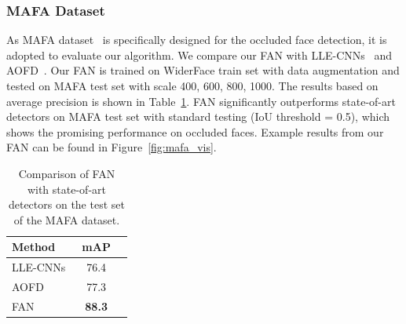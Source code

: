 \documentclass[10pt,twocolumn,letterpaper]{article}
\begin{document}
\begin{table}[t]
\begin{center}
\end{center}
\caption{Comparison of FAN with state-of-art detectors on the test set of the WiderFace dataset.}
\label{table: widerface_result}
\end{table}

\subsubsection{MAFA Dataset} 
As MAFA dataset~\cite{Ge_2017_CVPR} is specifically designed for the occluded face detection, it is adopted to evaluate our algorithm. We compare our FAN with LLE-CNNs~\cite{Ge_2017_CVPR} and AOFD~\cite{chen2017masquer}. Our FAN is trained on WiderFace train set with data augmentation and tested on MAFA test set with scale {400, 600, 800, 1000}. The results based on average precision is shown in Table~\ref{table: mafa_result}. FAN significantly outperforms state-of-art detectors on MAFA test set with standard testing (IoU threshold = 0.5), which shows the promising performance on occluded faces. Example results from our FAN can be found in Figure~\ref{fig:mafa_vis}.

\begin{table}[t]
\begin{center}
\begin{tabular}{|l|c|c|}
\hline
Method & mAP \\
\hline
LLE-CNNs~\cite{Ge_2017_CVPR} & 76.4 \\
AOFD~\cite{chen2017masquer} & 77.3 \\
\hline
FAN & \textbf{88.3} \\
\hline
\end{tabular}
\end{center}
\caption{Comparison of FAN with state-of-art detectors on the test set of the MAFA dataset.}
\label{table: mafa_result}
\end{table}
\end{document}
